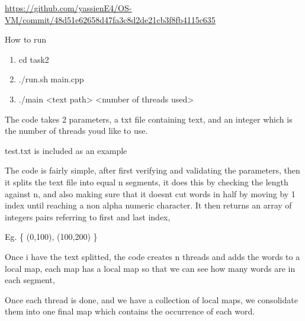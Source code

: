 \href{https://github.com/yassienE4/OS-VM/commit/48d51e62658d47fa3c8d2de21cb3f8fb4115c635}{\ul{https://github.com/yassienE4/OS-VM/commit/48d51e62658d47fa3c8d2de21cb3f8fb4115c635}}

How to run

\begin{enumerate}
\def\labelenumi{\arabic{enumi}.}
\item
  cd task2
\item
  ./run.sh main.cpp
\item
  ./main \textless text path\textgreater{} \textless number of threads
  used\textgreater{}
\end{enumerate}

The code takes 2 parameters, a txt file containing text, and an integer
which is the number of threads you\textquotesingle d like to use.

test.txt is included as an example

The code is fairly simple, after first verifying and validating the
parameters, then it splits the text file into equal n segments, it does
this by checking the length against n, and also making sure that it
doesn\textquotesingle t cut words in half by moving by 1 index until
reaching a non alpha numeric character. It then returns an array of
integers pairs referring to first and last index,

Eg. \{ (0,100), (100,200) \}

Once i have the text splitted, the code creates n threads and adds the
words to a local map, each map has a local map so that we can see how
many words are in each segment,

Once each thread is done, and we have a collection of local maps, we
consolidate them into one final map which contains the occurrence of
each word.
